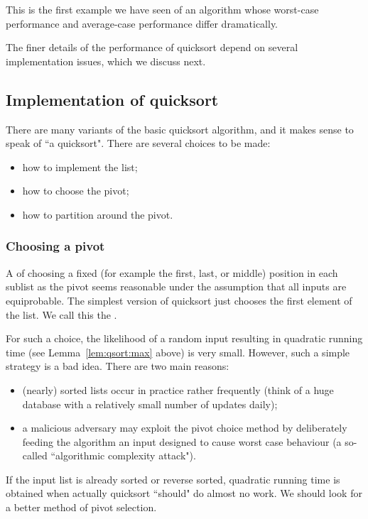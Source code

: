 This is the first example we have seen of an algorithm whose worst-case 
performance and average-case performance differ dramatically. 

The finer details of the performance of quicksort depend on several 
implementation issues, which we discuss next.

\subsection*{Implementation of quicksort}

There are many variants of the basic quicksort algorithm, and it makes sense to 
speak of ``a quicksort". There are several choices to be made:

\begin{itemize}
\item how to implement the list;
\item how to choose the pivot;
\item how to partition around the pivot.
\end{itemize}

\subsubsection*{Choosing a pivot}
A  of choosing 
a fixed (for example the first, last, or 
middle) position in each sublist as the pivot seems reasonable under the
assumption that all inputs are equiprobable. The simplest version of quicksort 
just chooses the first element of the list. We call this the .

For such a choice, the likelihood of a random input resulting in 
quadratic running time (see Lemma~\ref{lem:qsort:max} above) is very small. 
However, such a simple strategy is a bad idea. There are two main reasons:
\begin{itemize}
\item 
(nearly) sorted lists occur in practice rather frequently (think of a huge 
database with a relatively small number of updates daily);
\item 
a malicious adversary may exploit the pivot choice method by deliberately feeding
the algorithm an input designed to cause worst case behaviour (a so-called 
``algorithmic complexity attack").
\end{itemize}

If the input list is already sorted or reverse sorted, quadratic running time 
is obtained when actually quicksort ``should" do almost no work. We should look 
for a better method of pivot selection.

